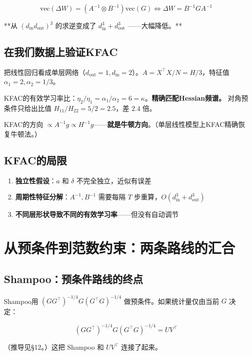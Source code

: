 \documentclass[12pt,a4paper]{article}
\begin{document}
\[\text{vec}(\Delta W) = (A^{-1} \otimes B^{-1})\text{vec}(G) \iff \Delta W = B^{-1}GA^{-1}\]

**从 $(d_{\text{in}}d_{\text{out}})^3$ 的求逆变成了 $d_{\text{in}}^3 + d_{\text{out}}^3$ ——大幅降低。**


\subsection{在我们数据上验证KFAC}

把线性回归看成单层网络（$d_{\text{out}}=1, d_{\text{in}}=2$）。$A = X^\top X/N = H/3$，特征值 $\alpha_1=2, \alpha_2=1/3$。

KFAC的有效学习率比：$\eta_2/\eta_1 = \alpha_1/\alpha_2 = 6 = \kappa$。\textbf{精确匹配Hessian频谱。}
对角预条件只给出比值 $H_{11}/H_{22} = 5/2 = 2.5$，差 $2.4$ 倍。

KFAC的方向 $\propto A^{-1}g \propto H^{-1}g$——\textbf{就是牛顿方向}。（单层线性模型上KFAC精确恢复牛顿法。）


\subsection{KFAC的局限}

\begin{enumerate}[leftmargin=*,nosep]
\item \textbf{独立性假设}：$a$ 和 $\delta$ 不完全独立，近似有误差
\item \textbf{周期性特征分解}：$A^{-1}, B^{-1}$ 需要每隔 $T$ 步重算，$O(d_{\text{in}}^3 + d_{\text{out}}^3)$
\item \textbf{不同层形状导致不同的有效学习率}——但没有自动调节

\end{enumerate}



\section{从预条件到范数约束：两条路线的汇合}


\subsection{Shampoo：预条件路线的终点}

Shampoo用 $(GG^\top)^{-1/4}G(G^\top G)^{-1/4}$ 做预条件。如果统计量仅由当前 $G$ 决定：


\[(GG^\top)^{-1/4}G(G^\top G)^{-1/4} = UV^\top\]

（推导见§12。）这把 Shampoo 和 $UV^\top$ 连接了起来。
\end{document}
